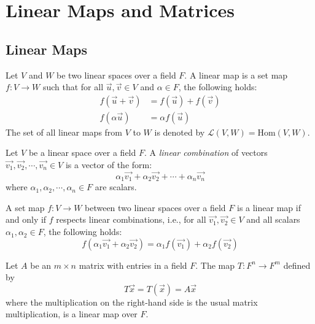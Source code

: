 \documentclass[11pt,fleqn]{book} %
\newcommand{\Hom}[2]{\text{Hom}(#1, #2)} %
\begin{document}
\chapter{Linear Maps and Matrices}

\section{Linear Maps}

\begin{definition}
    Let $V$ and $W$ be two linear spaces over a field $F$. A linear map is a set map $f: V \to W$ such that for all $\vec{u}, \vec{v} \in V$ and $\alpha \in F$, the following holds:
    \[
        \begin{split}
            f(\vec{u} + \vec{v}) &= f(\vec{u}) + f(\vec{v}) \\
            f(\alpha \vec{u}) &= \alpha f(\vec{u})
        \end{split}
    \]
    The set of all linear maps from $V$ to $W$ is denoted by $\mathcal{L}(V, W) = \Hom{V}{W}$.
\end{definition}

\begin{definition}
    Let $V$ be a linear space over a field $F$. A \emph{linear combination} of vectors $\vec{v_1}, \vec{v_2}, \cdots, \vec{v_n} \in V$ is a vector of the form:
    \[
        \alpha_1 \vec{v_1} + \alpha_2 \vec{v_2} + \cdots + \alpha_n \vec{v_n}
    \]
    where $\alpha_1, \alpha_2, \cdots, \alpha_n \in F$ are scalars.
\end{definition}

\begin{corollary}
    A set map $f: V \to W$ between two linear spaces over a field $F$ is a linear map if and only if $f$ respects linear combinations, i.e., for all $\vec{v_1}, \vec{v_2} \in V$ and all scalars $\alpha_1, \alpha_2 \in F$, the following holds:
    \[
        f(\alpha_1 \vec{v_1} + \alpha_2 \vec{v_2}) = \alpha_1 f(\vec{v_1}) + \alpha_2 f(\vec{v_2})
    \]
\end{corollary}

\begin{example}
    Let $A$ be an $m \times n$ matrix with entries in a field $F$. The map $T: F^n \to F^m$ defined by
    \[
        T\vec{x} = T(\vec{x}) = A \vec{x}
    \]
    where the multiplication on the right-hand side is the usual matrix multiplication, is a linear map over $F$.
\end{example}
\end{document}
